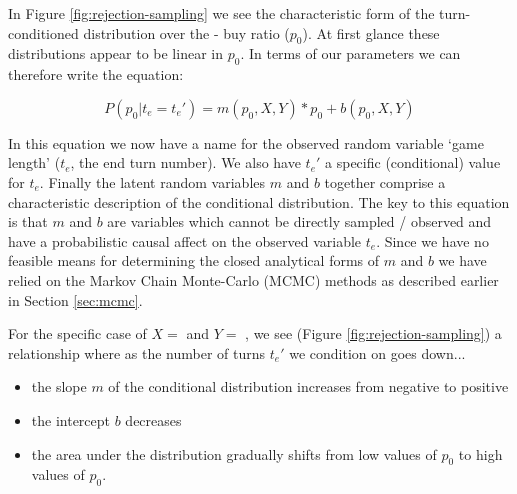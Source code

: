 

In Figure \ref{fig:rejection-sampling} we see the characteristic
form of the turn-conditioned distribution over the
 -  buy ratio ($p_0$). At first glance
these distributions appear to be linear in $p_0$. In terms of our
parameters we can therefore write the equation:

\begin{equation} \label{eqn:linear-distribution}
P(p_0 | t_e = t_e') = m(p_0, X, Y) * p_0 + b(p_0, X, Y)
\end{equation}

In this equation we now have a name for the observed random variable
`game length' ($t_e$, the end turn number).
We also have $t_e'$ a specific (conditional) value for $t_e$.
Finally the latent random variables $m$ and $b$ together comprise a
characteristic description of the conditional distribution. The
key to this equation is that $m$ and $b$ are variables which cannot
be directly sampled / observed and have a probabilistic causal affect
on the observed variable $t_e$.
Since we have no feasible means for determining the closed analytical
forms of $m$ and $b$ we have relied on the Markov Chain Monte-Carlo (MCMC)
methods as described earlier in Section \ref{sec:mcmc}.

For the specific case of $X =$  and $Y =$ ,
we see (Figure \ref{fig:rejection-sampling}) a relationship where as the
number of turns $t_e'$ we condition on goes down...

\begin{itemize}
\item the slope $m$ of the conditional distribution increases from negative to positive
\item the intercept $b$ decreases
\item the area under the distribution gradually shifts from low values of $p_0$ to
      high values of $p_0$.
\end{itemize}


